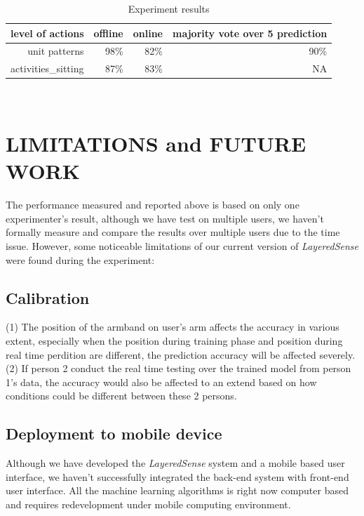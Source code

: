 \documentclass[a4paper, 10pt, conference]{IEEEtran}      %
\begin{document}
\begin{table}[htb]
\begin{tabular}{|r|r|r|r|}
  \hline

  \hline 
  \textbf{level of actions} & \textbf{offline} &\textbf{online} & \textbf{majority vote over 5 prediction} \\
  \hline
  \hline
   unit patterns &  98\% & 82\% & 90\% \\
  \hline
    activities\_sitting & 87\% & 83\% & NA \\

    \hline
    
 \end{tabular}
 \\
 \caption{Experiment results}   

\end{table}

\section{LIMITATIONS and FUTURE WORK}
The performance measured and reported above is based on only one experimenter's result, although we have test on multiple users, we haven't formally measure and compare the results over multiple users due to the time issue. However, some noticeable limitations of our current version of \emph{LayeredSense} were found during the experiment:
\subsection{Calibration}
(1) The position of the armband on user's arm affects the accuracy in various extent, especially when the position during training phase and position during real time perdition are different, the prediction accuracy will be affected severely.\\
(2) If person 2 conduct the real time testing over the trained model from person 1's data, the accuracy would also be affected to an extend based on how conditions could be different between these 2 persons.
\subsection{Deployment to mobile device}
Although we have developed the \emph{LayeredSense} system and a mobile based user interface, we haven't successfully integrated the back-end system with front-end user interface. All the machine learning algorithms is right now computer based and requires redevelopment under mobile computing environment.
\end{document}
